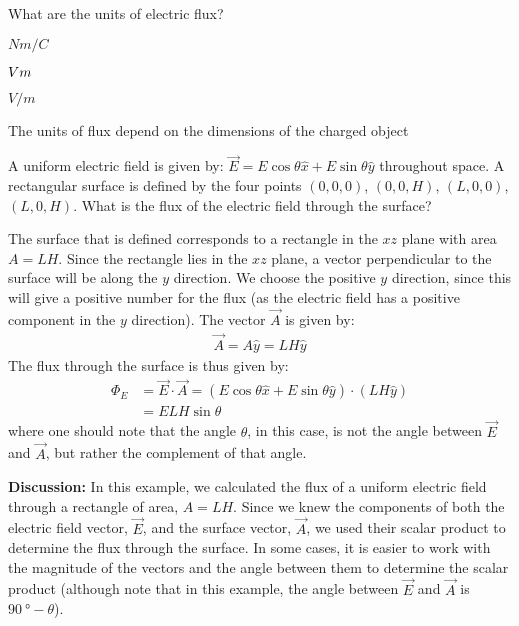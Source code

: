 \begin{checkpoint}\label{cp:gauss:unitsofflux}

	\begin{MCquestion}{What are the units of electric flux?}
		\item $Nm/C$
		\item $Vm $
		\item $V/m$
		\item The units of flux depend on the dimensions of the charged object
	\end{MCquestion}
\end{checkpoint}

\begin{example}{A uniform electric field is given by: $\vec E=E\cos\theta\hat x+E\sin\theta\hat y $ throughout space. A rectangular surface is defined by the four points $(0,0,0)$, $(0,0,H)$, $(L,0,0)$, $(L,0,H)$. What is the flux of the electric field through the surface?}

The surface that is defined corresponds to a rectangle in the $xz$ plane with area $A=LH$. Since the rectangle lies in the $xz$ plane, a vector perpendicular to the surface will be along the $y$ direction. We choose the positive $y$ direction, since this will give a positive number for the flux (as the electric field has a positive component in the $y$ direction). The vector $\vec A$ is given by:
\begin{align*}
\vec A =A\hat y=LH\hat y
\end{align*}
The flux through the surface is thus given by:
\begin{align*}
\Phi_E&=\vec E\cdot \vec A=(E\cos\theta\hat x+E\sin\theta\hat y)\cdot(LH\hat y)\\
&=ELH\sin\theta
\end{align*}
where one should note that the angle $\theta$, in this case, is not the angle between $\vec E$ and $\vec A$, but rather the complement of that angle. 

\textbf{Discussion:} In this example, we calculated the flux of a uniform electric field through a rectangle of area, $A=LH$. Since we knew the components of both the electric field vector, $\vec E$, and the surface vector, $\vec A$, we used their scalar product to determine the flux through the surface. In some cases, it is easier to work with the magnitude of the vectors and the angle between them to determine the scalar product (although note that in this example, the angle between $\vec E$ and $\vec A$ is $\SI{90}{\degree}-\theta$).
\end{example}

